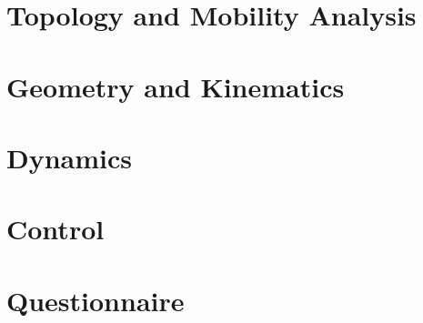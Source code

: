 \documentclass{scrreprt}
\subtitle{Coursework}
\begin{document}
\maketitle

\tableofcontents 

\cleardoublepage

\pagestyle{plain}


\chapter{Topology and Mobility Analysis}



\chapter{Geometry and Kinematics}


 
\chapter{Dynamics}



\chapter{Control}


\chapter{Questionnaire}




%

\end{document}
